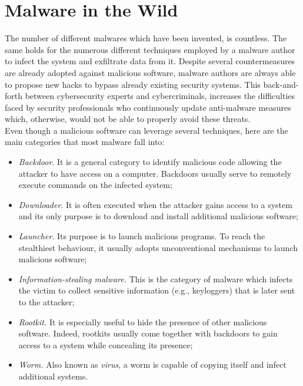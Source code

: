 \documentclass[LaM,binding=0.6cm]{sapthesis}
\begin{document}
\section{Malware in the Wild}
\label{sec:malwareinthewild}
The number of different malwares which have been invented, is countless. The same holds for the numerous different techniques employed by a malware author to infect the system and exfiltrate data from it. Despite several countermeasures are already adopted against malicious software, malware authors are always able to propose new hacks to bypass already existing security systems. This back-and-forth between cybersecurity experts and cybercriminals, increases the difficulties faced by security professionals who continuously update anti-malware measures which, otherwise, would not be able to properly avoid these threats.\\
Even though a malicious software can leverage several techniques, here are the main categories that most malware fall into:
\begin{itemize}
\item \textit{Backdoor}. It is a general category to identify malicious code allowing the attacker to have access on a computer. Backdoors usually serve to remotely execute commands on the infected system;
\item \textit{Downloader}. It is often executed when the attacker gains access to a system and its only purpose is to download and install additional malicious software;
\item \textit{Launcher}. Its purpose is to launch malicious programs. To reach the stealthiest behaviour, it usually adopts unconventional mechanisms to launch malicious software;
\item \textit{Information-stealing malware.} This is the category of malware which infects the victim to collect sensitive information (e.g., keyloggers) that is later sent to the attacker;
\item \textit{Rootkit.} It is especially useful to hide the presence of other malicious software. Indeed, rootkits usually come together with backdoors to gain access to a system while concealing its presence;
\item \textit{Worm.} Also known as \textit{virus}, a worm is capable of copying itself and infect additional systems.
\end{itemize}
\end{document}
